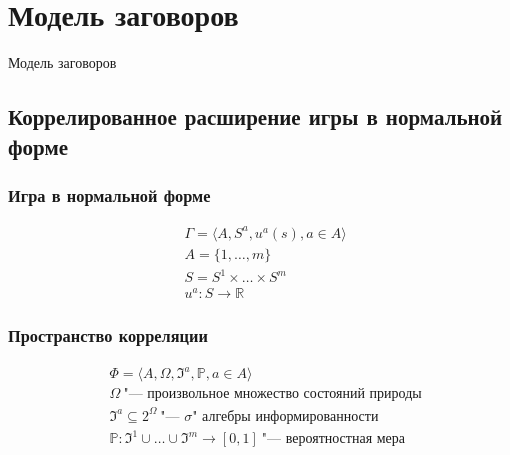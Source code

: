 \section{Модель заговоров}

\begin{frame}
    \begin{center}
        \Huge
        Модель заговоров
    \end{center}
\end{frame}

\subsection{Коррелированное расширение игры в нормальной форме}

\begin{frame}
    \frametitle{Игра в нормальной форме}
    \begin{align*}
    	&\Gamma = \langle A, S^a, u^a(s), a \in A \rangle \\
    	&A = \{1, \ldots, m\} \\
    	&S = S^1 \times \ldots \times S^m \\
    	&u^a : S \rightarrow \mathbb{R}
    \end{align*}
\end{frame}

\begin{frame}
	\frametitle{Пространство корреляции}
	\begin{align*}
		&\Phi = \langle A, \Omega, \mathfrak{I}^a, \mathbb{P}, a \in A \rangle \\
		&\Omega\ \text{"--- произвольное множество состояний природы} \\
		&\mathfrak{I}^a \subseteq 2^{\Omega}\ \text{"--- $\sigma$"~алгебры информированности} \\
		&\mathbb{P} : \mathfrak{I}^1 \cup \ldots \cup \mathfrak{I}^m \rightarrow [0, 1]\ \text{"--- вероятностная мера}
	\end{align*}
\end{frame}

